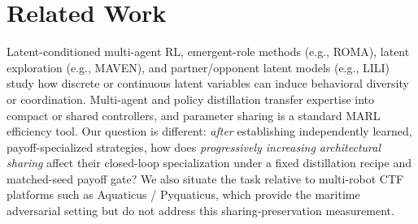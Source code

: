 \section{Related Work}
\label{sec:related}

Latent-conditioned multi-agent RL, emergent-role methods (e.g., ROMA), latent
exploration (e.g., MAVEN), and partner/opponent latent models (e.g., LILI)
study how discrete or continuous latent variables can induce behavioral
diversity or coordination. Multi-agent and policy distillation transfer
expertise into compact or shared controllers, and parameter sharing is a
standard MARL efficiency tool. Our question is different: \emph{after}
establishing independently learned, payoff-specialized strategies, how does
\emph{progressively increasing architectural sharing} affect their closed-loop
specialization under a fixed distillation recipe and matched-seed payoff gate?
We also situate the task relative to multi-robot CTF platforms such as
Aquaticus / Pyquaticus, which provide the maritime adversarial setting but do
not address this sharing-preservation measurement.

